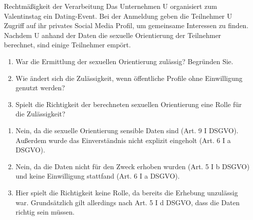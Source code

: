 \documentclass{article}
\begin{document}
\begin{exercise}{Rechtmäßigkeit der Verarbeitung}
  Das Unternehmen U organisiert zum Valentinstag ein Dating-Event. Bei der Anmeldung geben die Teilnehmer U Zugriff auf ihr privates Social Media Profil, um gemeinsame Interessen zu finden. Nachdem U anhand der Daten die sexuelle Orientierung der Teilnehmer berechnet, sind einige Teilnehmer empört.
  \begin{enumerate}
    \item War die Ermittlung der sexuellen Orientierung zulässig? Begründen Sie.
    \item Wie ändert sich die Zulässigkeit, wenn öffentliche Profile ohne Einwilligung genutzt werden?
    \item Spielt die Richtigkeit der berechneten sexuellen Orientierung eine Rolle für die Zulässigkeit?
  \end{enumerate}

  \begin{solution}
    \begin{enumerate}
      \item Nein, da die sexuelle Orientierung sensible Daten sind (Art. 9 I DSGVO). Außerdem wurde das Einverständnis nicht explizit eingeholt (Art. 6 I a DSGVO).
      \item Nein, da die Daten nicht für den Zweck erhoben wurden (Art. 5 I b DSGVO) und keine Einwilligung stattfand (Art. 6 I a DSGVO).
      \item Hier spielt die Richtigkeit keine Rolle, da bereits die Erhebung unzulässig war. Grundsätzlich gilt allerdings nach Art. 5 I d DSGVO, dass die Daten richtig sein müssen.
    \end{enumerate}
  \end{solution}
\end{exercise}
\end{document}
